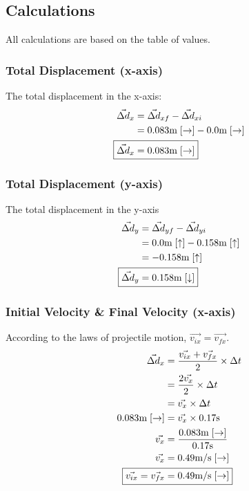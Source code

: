 \documentclass[a4paper,12pt]{article}
\begin{document}
	\newpage
	
	\subsection{Calculations}
	All calculations are based on the table of values. 
	\subsubsection{Total Displacement (x-axis)}
	The total displacement in the x-axis:
	\begin{align*}
		\vec{\Delta d}_x&=\vec{\Delta d}_{xf}-\vec{\Delta d}_{xi}\\
		&=0.083 \text{m}\;[\rightarrow]-0.0 \text{m}\; [\rightarrow]\\
		\Aboxed{\vec{\Delta d}_x&=0.083\text{m}\; [\rightarrow]}
	\end{align*}
	\subsubsection{Total Displacement (y-axis)}
	The total displacement in the y-axis
	\begin{align*}
		\vec{\Delta d}_y&=\vec{\Delta d}_{yf}-\vec{\Delta d}_{yi}\\
		&=0.0 \text{m}\; [\uparrow]-0.158 \text{m}\; [\uparrow]\\
		&=-0.158\text{m}\; [\uparrow]\\
		\Aboxed{\vec{\Delta d}_y&=0.158\text{m}\; [\downarrow]}
	\end{align*}
	\subsubsection{Initial Velocity \& Final Velocity (x-axis)}
	According to the laws of projectile motion, $\vec{v_{ix}}=\vec{v_{fx}}$.
	\begin{align*}
		\vec{\Delta d}_x&=\frac{\vec{v_{ix}}+\vec{v_{fx}}}{2}\times \Delta t\\
		&=\frac{2\vec{v_x}}{2}\times \Delta t\\
		&=\vec{v_x}\times \Delta t\\
		0.083\text{m}\; [\rightarrow]&=\vec{v_x} \times 0.17\text{s}\\
		\vec{v_x}&=\frac{0.083\text{m}\; [\rightarrow]}{0.17\text{s}}\\
		\vec{v_x}&=0.49\text{m}/\text{s}\;[\rightarrow]\\
		\Aboxed{\vec{v_{ix}}=\vec{v_{fx}}&=0.49\text{m}/\text{s}\;[\rightarrow]}
	\end{align*}
\end{document}
